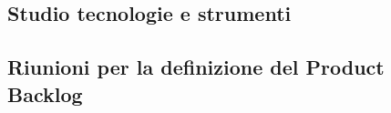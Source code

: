 \subsection{Studio tecnologie e strumenti}
\subsection{Riunioni per la definizione del Product Backlog}





    \label{risk:hardware-simulator} 



